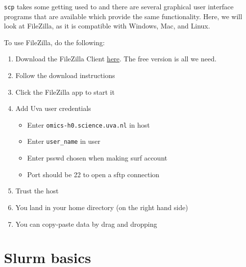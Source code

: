 \documentclass[
  letterpaper,
  DIV=11,
  numbers=noendperiod]{scrreprt}
\providecommand{\tightlist}{%
  \setlength{\itemsep}{0pt}\setlength{\parskip}{0pt}}\usepackage{longtable,booktabs,array}
\begin{document}
\begin{tcolorbox}[enhanced jigsaw, colframe=quarto-callout-tip-color-frame, breakable, opacityback=0, toptitle=1mm, left=2mm, coltitle=black, colbacktitle=quarto-callout-tip-color!10!white, title=\textcolor{quarto-callout-tip-color}{\faLightbulb}\hspace{0.5em}{Tip: Moving files using the FileZilla GUI}, rightrule=.15mm, bottomtitle=1mm, titlerule=0mm, colback=white, arc=.35mm, toprule=.15mm, bottomrule=.15mm, leftrule=.75mm, opacitybacktitle=0.6]

\texttt{scp} takes some getting used to and there are several graphical
user interface programs that are available which provide the same
functionality. Here, we will look at FileZilla, as it is compatible with
Windows, Mac, and Linux.

To use FileZilla, do the following:

\begin{enumerate}
\def\labelenumi{\arabic{enumi}.}
\tightlist
\item
  Download the FileZilla Client
  \href{https://filezilla-project.org/}{here}. The free version is all
  we need.
\item
  Follow the download instructions
\item
  Click the FileZilla app to start it
\item
  Add Uva user credentials

  \begin{itemize}
  \tightlist
  \item
    Enter \texttt{omics-h0.science.uva.nl} in host
  \item
    Enter \texttt{user\_name} in user
  \item
    Enter psswd chosen when making surf account
  \item
    Port should be 22 to open a sftp connection
  \end{itemize}
\item
  Trust the host
\item
  You land in your home directory (on the right hand side)
\item
  You can copy-paste data by drag and dropping
\end{enumerate}

\end{tcolorbox}

\section{Slurm basics}\label{slurm-basics}
\end{document}
